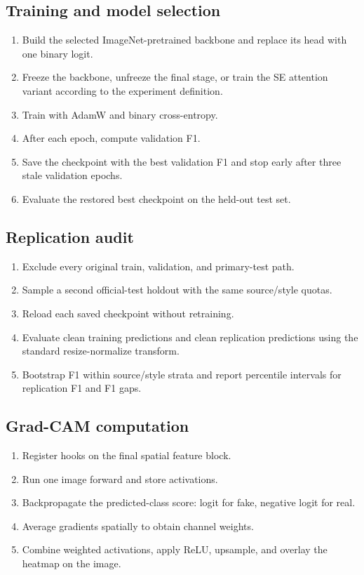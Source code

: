 \documentclass[11pt,a4paper]{article}
\begin{document}
\subsection*{Training and model selection}
\begin{enumerate}[leftmargin=*]
  \item Build the selected ImageNet-pretrained backbone and replace its head
  with one binary logit.
  \item Freeze the backbone, unfreeze the final stage, or train the SE
  attention variant according to the experiment definition.
  \item Train with AdamW and binary cross-entropy.
  \item After each epoch, compute validation F1.
  \item Save the checkpoint with the best validation F1 and stop early after
  three stale validation epochs.
  \item Evaluate the restored best checkpoint on the held-out test set.
\end{enumerate}

\subsection*{Replication audit}
\begin{enumerate}[leftmargin=*]
  \item Exclude every original train, validation, and primary-test path.
  \item Sample a second official-test holdout with the same source/style quotas.
  \item Reload each saved checkpoint without retraining.
  \item Evaluate clean training predictions and clean replication predictions
  using the standard resize-normalize transform.
  \item Bootstrap F1 within source/style strata and report percentile
  intervals for replication F1 and F1 gaps.
\end{enumerate}

\subsection*{Grad-CAM computation}
\begin{enumerate}[leftmargin=*]
  \item Register hooks on the final spatial feature block.
  \item Run one image forward and store activations.
  \item Backpropagate the predicted-class score: logit for fake, negative
  logit for real.
  \item Average gradients spatially to obtain channel weights.
  \item Combine weighted activations, apply ReLU, upsample, and overlay the
  heatmap on the image.
\end{enumerate}



\end{document}
